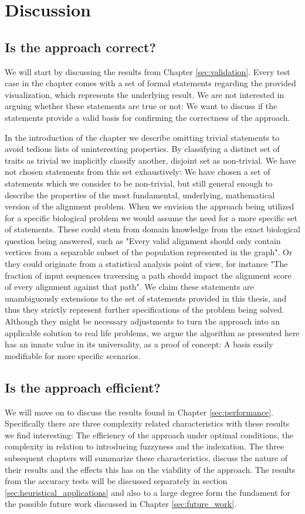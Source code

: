 \documentclass[thesis.tex]{subfiles}
\begin{document}
\chapter{Discussion}
\label{sec:discussion}
\section{Is the approach correct?}
We will start by discussing the results from Chapter \ref{sec:validation}. Every test case in the chapter comes with a set of formal statements regarding the provided visualization, which represents the underlying result. We are not interested in arguing whether these statements are true or not: We want to discuss if the statements provide a valid basis for confirming the correctness of the approach. \\
\par\noindent
In the introduction of the chapter we describe omitting trivial statements to avoid tedious lists of uninteresting properties. By classifying a distinct set of traits as trivial we implicitly classify another, disjoint set as non-trivial. We have not chosen statements from this set exhaustively: We have chosen a set of statements which we consider to be non-trivial, but still general enough to describe the properties of the most fundamental, underlying, mathematical version of the alignment problem. When we envision the approach being utilized for a specific biological problem we would assume the need for a more specific set of statements. These could stem from domain knowledge from the exact biological question being answered, such as "Every valid alignment should only contain vertices from a separable subset of the population represented in the graph". Or they could originate from a statistical analysis point of view, for instance "The fraction of input sequences traversing a path should impact the alignment score of every alignment against that path". We claim these statements are unambiguously extensions to the set of statements provided in this thesis, and thus they strictly represent further specifications of the problem being solved. Although they might be necessary adjustments to turn the approach into an applicable solution to real life problems, we argue the algorithm as presented here has an innate value in its universality, as a proof of concept: A basis easily modifiable for more specific scenarios.
\section{Is the approach efficient?}
We will move on to discuss the results found in Chapter \ref{sec:performance}. Specifically there are three complexity related characteristics with these results we find interesting: The efficiency of the approach under optimal conditions, the complexity in relation to introducing fuzzyness and the indexation. The three subsequent chapters will summarize these characteristics, discuss the nature of their results and the effects this has on the viability of the approach. The results from the accuracy tests will be discussed separately in section \ref{sec:heuristical_applications} and also to a large degree form the fundament for the possible future work discussed in Chapter \ref{sec:future_work}.
\end{document}
